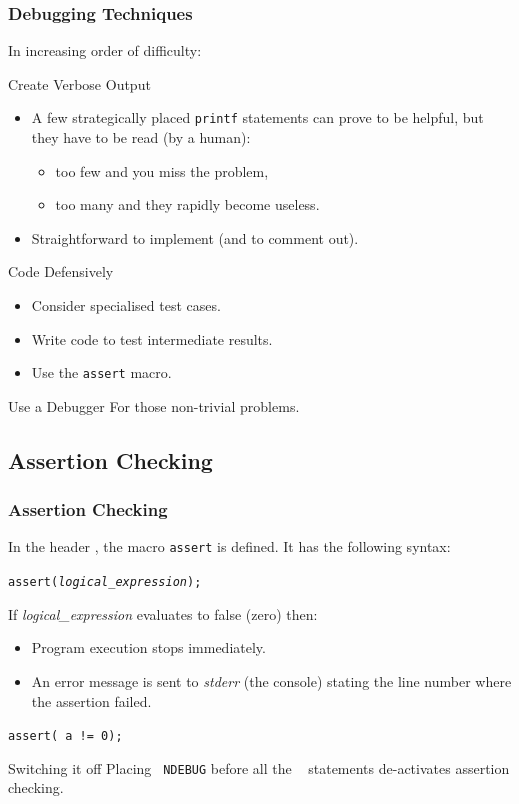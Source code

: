 \documentclass[smaller,handout,table]{beamer}
\begin{document}
\begin{frame}
\frametitle{Debugging Techniques}
{\footnotesize
In increasing order of difficulty:
\begin{block}{Create Verbose Output}
\begin{itemize}
\item A few strategically placed {\tt printf} statements can prove to be helpful, but they have to be read (by a human):
\begin{itemize}
\item too few and you miss the problem,
\item too many and they rapidly become useless.
\end{itemize}
\item Straightforward to implement (and to comment out).
\end{itemize}
\end{block}

\begin{block}{Code Defensively}
\begin{itemize}
\item Consider specialised test cases.
\item Write code to test intermediate results.
\item Use the {\tt assert} macro.
\end{itemize}
\end{block}

\begin{block}{Use a Debugger}
For those non-trivial problems.
\end{block}
}
\end{frame}

\subsection{Assertion Checking}
\begin{frame}
\frametitle{Assertion Checking}
In the header , the macro {\tt assert} is defined. It has the following syntax:\\
\begin{center}
\tt assert(\emph{logical\_expression});
\end{center}
If \emph{logical\_expression} evaluates to false (zero) then:
\begin{itemize}
\item Program execution stops immediately.
\item An error message is sent to \emph{stderr} (the console) stating the line number where the assertion failed.
\end{itemize} 
\begin{block}{}
{\tt assert( a != 0); }
\end{block}
\begin{exampleblock}{Switching it off}
Placing {\tt {} NDEBUG} before all the \mbox{\tt {} }
statements de-activates assertion checking.
\end{exampleblock}
\end{frame}
\end{document}
